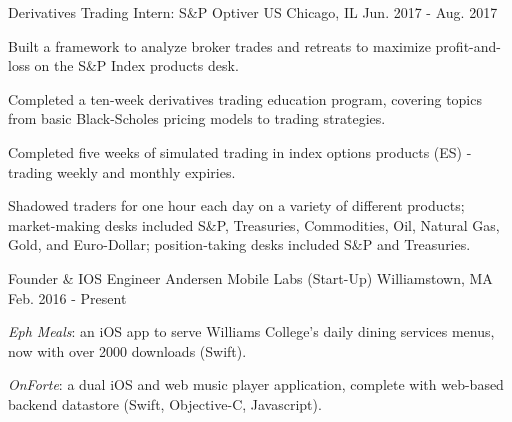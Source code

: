 

\begin{cventries}

  \cventry
    {Derivatives Trading Intern: S\&P} %
    {Optiver US} %
    {Chicago, IL} %
    {Jun. 2017 - Aug. 2017} %
    {
      \begin{cvitems} %
        \item {Built a framework to analyze broker trades and retreats to maximize profit-and-loss on the S\&P Index products desk.}
        \item {Completed a ten-week derivatives trading education program, covering topics from basic Black-Scholes pricing models to trading strategies.}
        \item {Completed five weeks of simulated trading in index options products (ES) - trading weekly and monthly expiries.}
        \item {Shadowed traders for one hour each day on a variety of different products; market-making desks included S\&P, Treasuries, Commodities, Oil, Natural Gas, Gold, and Euro-Dollar; position-taking desks included S\&P and Treasuries.}
      \end{cvitems}
    }

  \cventry
    {Founder \& IOS Engineer} %
    {Andersen Mobile Labs (Start-Up)} %
    {Williamstown, MA} %
    {Feb. 2016 - Present} %
    {
      \begin{cvitems} %
        \item {\textit{Eph Meals}: an iOS app to serve Williams College's daily dining services menus, now with over 2000 downloads (Swift).}
        \item {\textit{OnForte}: a dual iOS and web music player application, complete with web-based backend datastore (Swift, Objective-C, Javascript).}
      \end{cvitems}
    }


\end{cventries}
